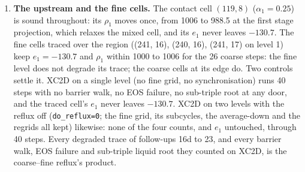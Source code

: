 \documentclass[11pt,a4paper]{article}
\newcommand{\code}[1]{\texttt{\small #1}}
\begin{document}
\begin{enumerate}[nosep]
      $\rho_1$ after the pass is $94.3478$, the vapour's $\rho_2$ before
      it to seven digits.  The degraded trace of follow-up 21, a
      ``liquid'' at 94 to 461\,kg/m$^3$, is the corridor's own
      projection of a trace whose energy the reflux had corrupted.
\item \textbf{The upstream and the fine cells.}  The contact cell
      $(119, 8)$ ($\alpha_1 = 0.25$) is sound throughout: its $\rho_1$
      moves once, from 1006 to 988.5 at the first stage projection,
      which relaxes the mixed cell, and its $e_1$ never leaves
      $-130.7$.  The fine cells traced over the region ((241, 16),
      (240, 16), (241, 17) on level 1) keep $e_1 = -130.7$ and
      $\rho_1$ within 1000 to 1006 for the 26 coarse steps: the fine
      level does not degrade its trace; the coarse cells at its edge
      do.  Two controls settle it.  XC2D on a single level (no fine grid, no
      synchronisation) runs 40 steps with no barrier walk, no EOS
      failure, no sub-triple root at any door, and the traced cell's
      $e_1$ never leaves $-130.7$.  XC2D on two levels with the reflux
      off (\code{do\_reflux=0}; the fine grid, its subcycles, the
      average-down and the regrids all kept) likewise: none of the
      four counts, and $e_1$ untouched, through 40 steps.  Every
      degraded trace of follow-ups 16d to 23, and every barrier walk,
      EOS failure and sub-triple liquid root they counted on XC2D, is
      the coarse--fine reflux's product.
\end{enumerate}
\end{document}
